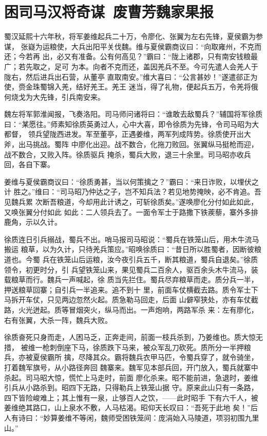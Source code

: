 \chapter{困司马汉将奇谋~废曹芳魏家果报}

蜀汉延熙十六年秋，将军姜维起兵二十万，令廖化、张翼为左右先锋，夏侯霸为参谋，
张嶷为运粮使，大兵出阳平关伐魏。维与夏侯霸商议曰：“向取雍州，不克而还；今若再
出，必又有准备。公有何高见？”霸曰：“陇上诸郡，只有南安钱粮最广；若先取之，足可
为本。向者不克而还，盖因羌兵不至。今可先遣人会羌人于陇右，然后进兵出石营，从董亭
直取南安。”维大喜曰：“公言甚妙！”遂遣郤正为使，赍金珠蜀锦入羌，结好羌王。羌王
迷当，得了礼物，便起兵五万，令羌将俄何烧戈为大先锋，引兵南安来。

魏左将军郭淮闻报，飞奏洛阳。司马师问诸将曰：“谁敢去敌蜀兵？”辅国将军徐质
曰：“某愿往。”师素知徐质英勇过人，心中大喜，即令徐质为先锋，令司马昭为大都督，
领兵望陇西进发。军至董亭，正遇姜维，两军列成阵势。徐质使开出大斧，出马挑战。蜀阵
中廖化出迎。战不数合，化拖刀败回。张翼纵马挺枪而迎，战不数合，又败入阵。徐质驱兵
掩杀，蜀兵大败，退三十余里。司马昭亦收兵回，各自下寨。

姜维与夏侯霸商议曰：“徐质勇甚，当以何策擒之？”霸曰：“来日诈败，以埋伏之计
胜之。”维曰：“司马昭乃仲达之子，岂不知兵法？若见地势掩映，必不肯追。吾见魏兵累
次断吾粮道，今却用此计诱之，可斩徐质矣。”遂唤廖化分付如此如此，又唤张翼分付如此
如此：二人领兵去了。一面令军士于路撒下铁蒺藜，寨外多排鹿角，示以久计。

徐质连日引兵搦战，蜀兵不出。哨马报司马昭说：“蜀兵在铁笼山后，用木牛流马搬运
粮草，以为久计，只待羌兵策应。”昭唤徐质曰：“昔日所以胜蜀者，因断彼粮道也。今蜀
兵在铁笼山后运粮，汝今夜引兵五千，断其粮道，蜀兵自退矣。”徐质领令，初更时分，引
兵望铁笼山来，果见蜀兵二百余人，驱百余头木牛流马，装载粮草而行。魏兵一声喊起，徐
质当先拦住。蜀兵尽弃粮草而走。质分兵一半，押送粮草回寨；自引兵一半追来。追不到十
里，前面车仗横截去路。质令军士下马拆开车仗，只见两边忽然火起。质急勒马回走，后面
山僻窄狭处，亦有车仗截路，火光迸起。质等冒烟突火，纵马而出。一声炮响，两路军杀
来：左有廖化，右有张翼，大杀一阵，魏兵大败。

徐质奋死只身而走，人困马乏，正奔走间，前面一枝兵杀到，乃姜维也。质大惊无措，
被维一枪刺倒座下马，徐质跌下马来，被众军乱刀砍死。质所分一半押粮兵，亦被夏侯霸所
擒，尽降其众。霸将魏兵衣甲马匹，令蜀兵穿了，就令骑坐，打着魏军旗号，从小路径奔回
魏寨来。魏军见本部兵回，开门放入，蜀兵就寨中杀起。司马昭大惊，慌忙上马走时，前面
廖化杀来。昭不能前进，急退时，姜维引兵从小路杀到。昭四下无路，只得勒兵上铁笼山据
守。原来此山只有一条路，四下皆险峻难上；其上惟有一泉，止够百人之饮，——此时昭手
下有六千人，被姜维绝其路口，山上泉水不敷，人马枯渴。昭仰天长叹曰：“吾死于此地
矣！”后人有诗曰：“妙算姜维不等闲，魏师受困铁笼间：庞涓始入马陵道，项羽初围九里
山。”

